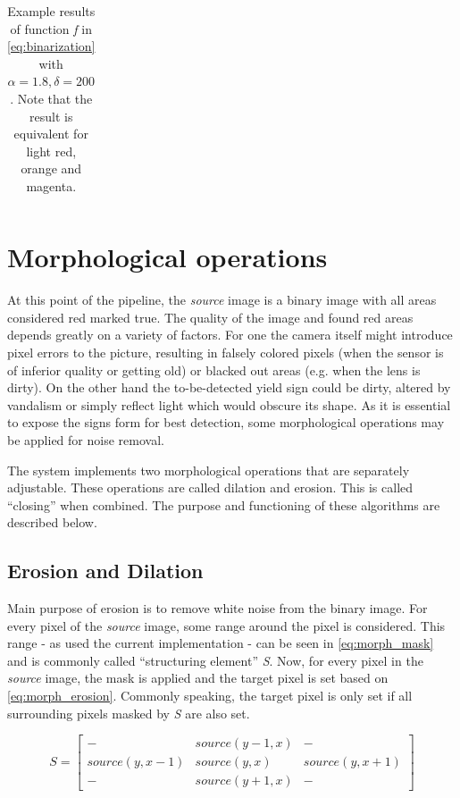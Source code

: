 \documentclass{report}
\begin{document}
\begin{table}
\begin{tabular}{c r r r r r}
  \end{tabular}
  \caption{Example results of function \textit{f} in
    \ref{eq:binarization} with \( \alpha=1.8, \delta=200 \). Note that
    the result is equivalent for light red, orange and magenta.}
  \label{table:binarization}
\end{table}

{}


\section{Morphological operations}

At this point of the pipeline, the \textit{source} image is a binary
image with all areas considered red marked true. The quality of the
image and found red areas depends greatly on a variety of factors. For
one the camera itself might introduce pixel errors to the picture,
resulting in falsely colored pixels (when the sensor is of inferior
quality or getting old) or blacked out areas (e.g. when the lens is
dirty). On the other hand the to-be-detected yield sign could be
dirty, altered by vandalism or simply reflect light which would
obscure its shape. As it is essential to expose the signs form for
best detection, some morphological operations may be applied for noise
removal.

The system implements two morphological operations that are separately
adjustable. These operations are called dilation and erosion. This is
called ``closing'' when combined. The purpose and functioning of these
algorithms are described below.


\subsection{Erosion and Dilation}

Main purpose of erosion is to remove white noise from the binary
image. For every pixel of the \textit{source} image, some range around
the pixel is considered. This range - as used the current
implementation - can be seen in \ref{eq:morph_mask} and is commonly
called ``structuring element'' \textit{S}. Now, for every pixel in the
\textit{source} image, the mask is applied and the target pixel is set
based on \ref{eq:morph_erosion}. Commonly speaking, the target pixel
is only set if all surrounding pixels masked by \textit{S} are also
set.

\begin{equation}\label{eq:morph_mask}
  S = \begin{bmatrix}

    -              & source(y-1, x) & -              \\
    source(y, x-1) & source(y, x)   & source(y, x+1) \\
    -              & source(y+1, x) & -

  \end{bmatrix}
\end{equation}
\end{document}
